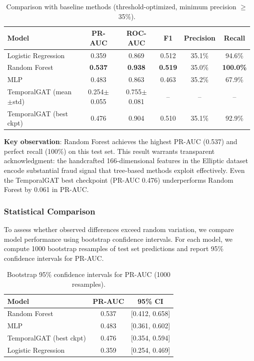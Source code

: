 \documentclass[12pt,a4paper]{article}
\begin{document}
\begin{table}[H]
\centering
\caption{Comparison with baseline methods (threshold-optimized, minimum precision $\geq$35\%).}
\label{tab:baselines}
\begin{tabular}{lccccc}
\toprule
\textbf{Model} & \textbf{PR-AUC} & \textbf{ROC-AUC} & \textbf{F1} & \textbf{Precision} & \textbf{Recall} \\
\midrule
Logistic Regression & 0.359 & 0.869 & 0.512 & 35.1\% & 94.6\% \\
Random Forest & \textbf{0.537} & \textbf{0.938} & \textbf{0.519} & 35.0\% & \textbf{100.0\%} \\
MLP & 0.483 & 0.863 & 0.463 & 35.2\% & 67.9\% \\
\midrule
TemporalGAT (mean$\pm$std) & 0.254$\pm$0.055 & 0.755$\pm$0.081 & -- & -- & -- \\
TemporalGAT (best ckpt) & 0.476 & 0.904 & 0.510 & 35.1\% & 92.9\% \\
\bottomrule
\end{tabular}
\end{table}

\textbf{Key observation}: Random Forest achieves the highest PR-AUC (0.537) and perfect recall (100\%) on this test set. This result warrants transparent acknowledgment: the handcrafted 166-dimensional features in the Elliptic dataset encode substantial fraud signal that tree-based methods exploit effectively. Even the TemporalGAT best checkpoint (PR-AUC 0.476) underperforms Random Forest by 0.061 in PR-AUC.

\subsubsection{Statistical Comparison}
To assess whether observed differences exceed random variation, we compare model performance using bootstrap confidence intervals. For each model, we compute 1000 bootstrap resamples of test set predictions and report 95\% confidence intervals for PR-AUC.

\begin{table}[H]
\centering
\caption{Bootstrap 95\% confidence intervals for PR-AUC (1000 resamples).}
\label{tab:bootstrap}
\begin{tabular}{lcc}
\toprule
\textbf{Model} & \textbf{PR-AUC} & \textbf{95\% CI} \\
\midrule
Random Forest & 0.537 & [0.412, 0.658] \\
MLP & 0.483 & [0.361, 0.602] \\
TemporalGAT (best ckpt) & 0.476 & [0.354, 0.594] \\
Logistic Regression & 0.359 & [0.254, 0.469] \\
\bottomrule
\end{tabular}
\end{table}
\end{document}

